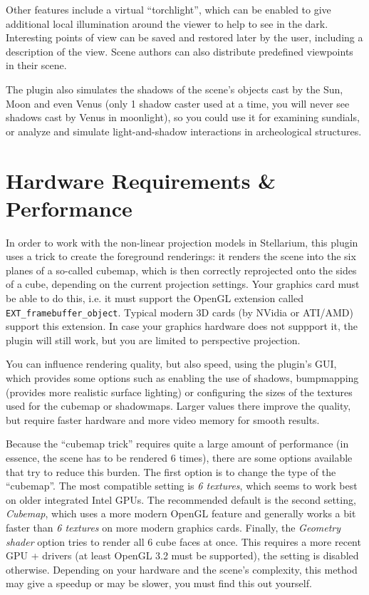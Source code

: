 \documentclass[a4paper]{article}
\begin{document}
Other features include a virtual ``torchlight'', which can be enabled to give
additional local illumination around the viewer to help to see in the dark.
Interesting points of view can be saved and restored later by the user,
including a description of the view. Scene authors can also distribute
predefined viewpoints in their scene.

The plugin also simulates the shadows of the scene's objects cast by
the Sun, Moon and even Venus (only 1 shadow caster used at a time, you
will never see shadows cast by Venus in moonlight), so you could use
it for examining sundials, or analyze and simulate light-and-shadow
interactions in archeological structures.

\section{Hardware Requirements \& Performance}
\label{sec:HardwareRequirements}

In order to work with the non-linear projection models in Stellarium,
this plugin uses a trick to create the foreground renderings: it
renders the scene into the six planes of a so-called cubemap, which is
then correctly reprojected onto the sides of a cube, depending on the
current projection settings. Your graphics card must be able to do
this, i.e. it must support the OpenGL extension called
\texttt{EXT\_framebuffer\_object}. Typical modern 3D cards (by NVidia
or ATI/AMD) support this extension. In case your graphics hardware
does not suppport it, the plugin will still work, but you are limited
to perspective projection.

You can influence rendering quality, but also speed, using the plugin's 
GUI, which provides some options such as enabling the use
of shadows, bumpmapping (provides more realistic surface lighting) or 
configuring the sizes of the textures used
for the cubemap or shadowmaps. Larger values there improve the quality,
but require faster hardware and more video memory for smooth results.

Because the ``cubemap trick'' requires quite a large amount of performance (in
essence, the scene has to be rendered 6 times), there are some options available
that try to reduce this burden. The first option is to change the type of the
``cubemap''. The most compatible setting is \emph{6 textures}, which seems to
work best on older integrated Intel GPUs. The recommended default is the second
setting, \emph{Cubemap}, which uses a more modern OpenGL feature and generally
works a bit faster than \emph{6 textures} on more modern graphics cards. Finally,
the \emph{Geometry shader} option tries to render all 6 cube faces at once. This
requires a more recent GPU + drivers (at least OpenGL 3.2 must be supported),
the setting is disabled otherwise. Depending on your hardware and the scene's
complexity, this method may give a speedup or may be slower, you must find this out yourself.
\end{document}
